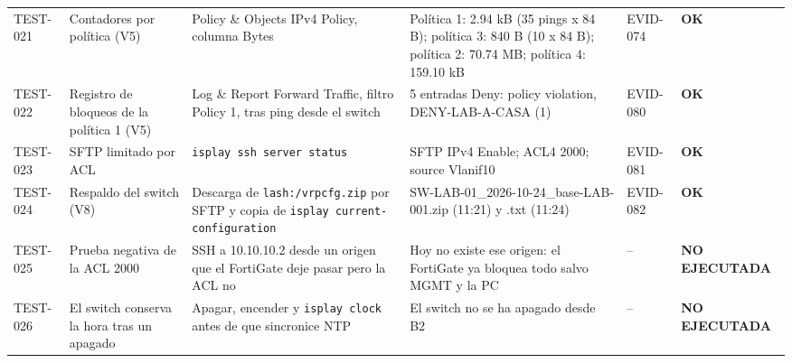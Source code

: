 \documentclass[11pt,a4paper]{article}
\newcommand{\estado}[1]{%
  \ifstrequal{#1}{COMPLETADA}{\textcolor{okgreen}{\textbf{\footnotesize #1}}}{%
  \ifstrequal{#1}{OPERATIVO VALIDADO}{\textcolor{okgreen}{\textbf{\footnotesize #1}}}{%
  \ifstrequal{#1}{OK}{\textcolor{okgreen}{\textbf{\footnotesize #1}}}{%
  \ifstrequal{#1}{RESUELTO}{\textcolor{okgreen}{\textbf{\footnotesize #1}}}{%
  \ifstrequal{#1}{EN CURSO}{\textcolor{amber}{\textbf{\footnotesize #1}}}{%
  \ifstrequal{#1}{REPORTADO}{\textcolor{amber}{\textbf{\footnotesize #1}}}{%
  \ifstrequal{#1}{NO EJECUTADA}{\textcolor{muted}{\textbf{\footnotesize #1}}}{%
  \ifstrequal{#1}{PROPUESTO}{\textcolor{violet}{\textbf{\footnotesize #1}}}{%
  \ifstrequal{#1}{PENDIENTE}{\textcolor{alertred}{\textbf{\footnotesize #1}}}{%
  \textbf{\footnotesize #1}}}}}}}}}}}
\newcommand{\fn}[1]{\texttt{\fnbreaks#1\fnend}}
\def\fnbreaks#1\fnend{\begingroup\fnactive\scantokens{#1\noexpand}\endgroup}
\gdef\fnactive{\catcode`\-=\active\catcode`\/=\active
  \def-{\char`\-\allowbreak}\def/{\char`\/\allowbreak}\let\_\fnus}
\newcommand{\fnus}{\textunderscore\allowbreak}
\begin{document}
{\begin{longtable}{L{1.35cm} L{2.7cm} L{3.15cm} L{3.6cm} L{1.4cm} L{2.4cm}}
  TEST-021 & Contadores por política (V5) & Policy \& Objects \textrightarrow{} IPv4 Policy, columna Bytes & Política 1: 2.94 kB (35 pings x 84 B); política 3: 840 B (10 x 84 B); política 2: 70.74 MB; política 4: 159.10 kB & EVID-074 & \estado{OK}\\
  TEST-022 & Registro de bloqueos de la política 1 (V5) & Log \& Report \textrightarrow{} Forward Traffic, filtro Policy 1, tras ping desde el switch & 5 entradas Deny: policy violation, DENY-LAB-A-CASA (1) & EVID-080 & \estado{OK}\\
  TEST-023 & SFTP limitado por ACL & \fn{display ssh server status} & SFTP IPv4 Enable; ACL4 2000; source Vlanif10 & EVID-081 & \estado{OK}\\
  TEST-024 & Respaldo del switch (V8) & Descarga de \fn{flash:/vrpcfg.zip} por SFTP y copia de \fn{display current-configuration} & SW-LAB-01\_2026-10-24\_base-LAB-001.zip (11:21) y .txt (11:24) & EVID-082 & \estado{OK}\\
  TEST-025 & Prueba negativa de la ACL 2000 & SSH a 10.10.10.2 desde un origen que el FortiGate deje pasar pero la ACL no & Hoy no existe ese origen: el FortiGate ya bloquea todo salvo MGMT y la PC & -- & \estado{NO EJECUTADA}\\
  TEST-026 & El switch conserva la hora tras un apagado & Apagar, encender y \fn{display clock} antes de que sincronice NTP & El switch no se ha apagado desde B2 & -- & \estado{NO EJECUTADA}\\
  \bottomrule
\end{longtable}
}
\end{document}
